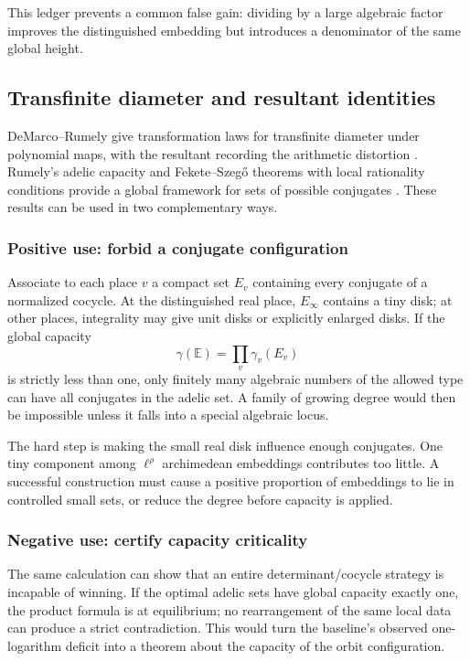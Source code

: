 \documentclass[10pt,letterpaper]{article}
\begin{document}
This ledger prevents a common false gain: dividing by a large algebraic factor improves the
distinguished embedding but introduces a denominator of the same global height.

\subsection{Transfinite diameter and resultant identities}

DeMarco--Rumely give transformation laws for transfinite diameter under polynomial maps,
with the resultant recording the arithmetic distortion \cite{DeMarcoRumely}.  Rumely's
adelic capacity and Fekete--Szeg\H{o} theorems with local rationality conditions provide a
global framework for sets of possible conjugates \cite{RumelyFeketeSzego}.  These results
can be used in two complementary ways.

\subsubsection{Positive use: forbid a conjugate configuration}

Associate to each place \(v\) a compact set \(E_v\) containing every conjugate of a
normalized cocycle.  At the distinguished real place, \(E_\infty\) contains a tiny disk; at
other places, integrality may give unit disks or explicitly enlarged disks.  If the global
capacity
\[
  \gamma(\mathbb E)=\prod_v\gamma_v(E_v)
\]
is strictly less than one, only finitely many algebraic numbers of the allowed type can have
all conjugates in the adelic set.  A family of growing degree would then be impossible unless
it falls into a special algebraic locus.

The hard step is making the small real disk influence enough conjugates.  One tiny component
among \(\ell^\rho\) archimedean embeddings contributes too little.  A successful construction
must cause a positive proportion of embeddings to lie in controlled small sets, or reduce
the degree before capacity is applied.

\subsubsection{Negative use: certify capacity criticality}

The same calculation can show that an entire determinant/cocycle strategy is incapable of
winning.  If the optimal adelic sets have global capacity exactly one, the product formula is
at equilibrium; no rearrangement of the same local data can produce a strict contradiction.
This would turn the baseline's observed one-logarithm deficit into a theorem about the
capacity of the orbit configuration.
\end{document}
